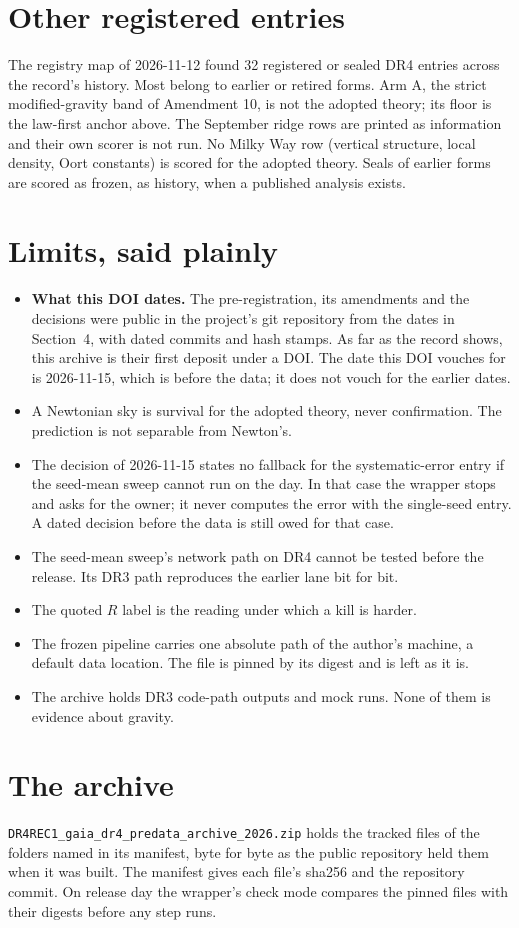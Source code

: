 \documentclass[10pt]{article}
\begin{document}
\section{Other registered entries}
The registry map of 2026-11-12 found 32 registered or sealed DR4 entries across the record's history. Most belong to earlier or retired forms.
Arm A, the strict modified-gravity band of Amendment 10, is not the adopted theory; its floor is the law-first anchor above.
The September ridge rows are printed as information and their own scorer is not run.
No Milky Way row (vertical structure, local density, Oort constants) is scored for the adopted theory. Seals of earlier forms are scored as frozen, as history, when a published analysis exists.

\section{Limits, said plainly}
\begin{itemize}
\item \textbf{What this DOI dates.} The pre-registration, its amendments and the decisions were public in the project's git repository from the dates in Section~4, with dated commits and hash stamps. As far as the record shows, this archive is their first deposit under a DOI. The date this DOI vouches for is 2026-11-15, which is before the data; it does not vouch for the earlier dates.
\item A Newtonian sky is survival for the adopted theory, never confirmation. The prediction is not separable from Newton's.
\item The decision of 2026-11-15 states no fallback for the systematic-error entry if the seed-mean sweep cannot run on the day. In that case the wrapper stops and asks for the owner; it never computes the error with the single-seed entry. A dated decision before the data is still owed for that case.
\item The seed-mean sweep's network path on DR4 cannot be tested before the release. Its DR3 path reproduces the earlier lane bit for bit.
\item The quoted $R$ label is the reading under which a kill is harder.
\item The frozen pipeline carries one absolute path of the author's machine, a default data location. The file is pinned by its digest and is left as it is.
\item The archive holds DR3 code-path outputs and mock runs. None of them is evidence about gravity.
\end{itemize}

\section{The archive}
\texttt{DR4REC1\_gaia\_dr4\_predata\_archive\_2026.zip} holds the tracked files of the folders named in its manifest, byte for byte as the public repository held them when it was built. The manifest gives each file's sha256 and the repository commit. On release day the wrapper's check mode compares the pinned files with their digests before any step runs.
\end{document}
